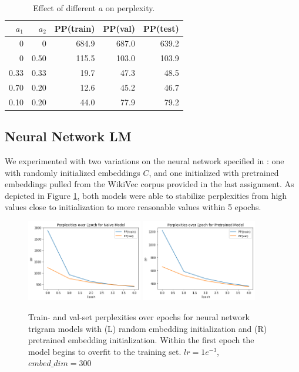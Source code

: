 \documentclass[11pt]{article}
\begin{document}
\begin{table}[h]
  \centering
  \begin{tabular}{@{}rrrrr@{}}
  \toprule
  \textbf{$a_1$} & \textbf{$a_2$} & \textbf{PP(train)} & \textbf{PP(val)} & \textbf{PP(test)} \\ \midrule
  0 & 0 & 684.9 & 687.0 & 639.2 \\
  0 & 0.50 & 115.5 & 103.0 & 103.9 \\
  0.33 & 0.33 & 19.7 & 47.3 & 48.5 \\
  0.70 & 0.20 & 12.6 & 45.2 & 46.7 \\
  0.10 & 0.20 & 44.0 & 77.9 & 79.2 \\
  \bottomrule
  \end{tabular}
  \caption{Effect of different $a$ on perplexity.}
  \label{tab:a-pps}
\end{table}

\subsection{Neural Network LM}

We experimented with two variations on the neural network specified in \cite{bengio2003neural}: one with randomly initialized embeddings $C$, and one initialized with pretrained embeddings pulled from the WikiVec corpus provided in the last assignment. As depicted in Figure \ref{fig:nn-pps}, both models were able to stabilize perplexities from high values close to initialization to more reasonable values within 5 epochs.

\begin{figure}[h]
  \centering
  \includegraphics[width=0.45\textwidth]{figures/nn_naive_pp.png}
  \includegraphics[width=0.45\textwidth]{figures/nn_pretrained_pp.png}
  \caption{Train- and val-set perplexities over epochs for neural network trigram models with (L) random embedding initialization and (R) pretrained embedding initialization. Within the first epoch the model begins to overfit to the training set. $lr=1e^{-3}$, $embed\_dim=300$}
  \label{fig:nn-pps}
\end{figure}
\end{document}

